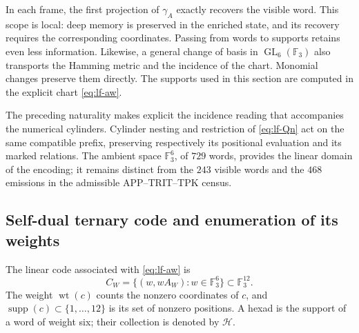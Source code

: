 In each frame, the first projection of \(\gamma_A\) exactly
recovers the visible word. This scope is local: deep
memory is preserved in the enriched state, and its
recovery requires the corresponding coordinates. Passing
from words to supports retains even less information.
Likewise, a general change of basis in
\(\operatorname{GL}_6(\mathbb F_3)\) also transports the Hamming
metric and the incidence of the chart. Monomial changes
preserve them directly. The supports used in this
section are computed in the explicit chart \eqref{eq:lf-aw}.

The preceding naturality makes explicit the incidence reading that
accompanies the numerical cylinders. Cylinder nesting
and restriction of \eqref{eq:lf-Qn} act on the same
compatible prefix, preserving respectively its positional
evaluation and its marked relations. The ambient space
\(\mathbb F_3^6\), of \(729\) words, provides the linear
domain of the encoding; it remains distinct from
the \(243\) visible words and the \(468\) emissions in the
admissible APP--TRIT--TPK census.

\subsection{Self-dual ternary code and enumeration of its weights}
\label{subsec:lf-code}

\begin{definition}
The linear code associated with \eqref{eq:lf-aw} is
\[
 C_W=\{(w,wA_W):w\in\mathbb F_3^6\}\subset\mathbb F_3^{12}.
\]
The weight \(\operatorname{wt}(c)\) counts the nonzero coordinates
of \(c\), and \(\operatorname{supp}(c)\subset\{1,\ldots,12\}\)
is its set of nonzero positions. A hexad is the support
of a word of weight six; their collection is denoted by \(\mathcal H\).
\end{definition}

